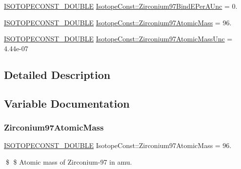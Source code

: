 \begin{DoxyCompactItemize}
\mbox{\hyperlink{group___isotope_const-_macros_ga8f45a7272ce02c0b4c65c44636ed719a}{I\+S\+O\+T\+O\+P\+E\+C\+O\+N\+S\+T\+\_\+\+D\+O\+U\+B\+LE}} \mbox{\hyperlink{group___isotope_const-_zirconium-_zr97_ga4cab043a49d376b7a4b9d2be0797d036}{Isotope\+Const\+::\+Zirconium97\+Bind\+E\+Per\+A\+Unc}} = 0.
\item 
\mbox{\hyperlink{group___isotope_const-_macros_ga8f45a7272ce02c0b4c65c44636ed719a}{I\+S\+O\+T\+O\+P\+E\+C\+O\+N\+S\+T\+\_\+\+D\+O\+U\+B\+LE}} \mbox{\hyperlink{group___isotope_const-_zirconium-_zr97_ga5b9400ceeea44bc77dfec0ffc5feb961}{Isotope\+Const\+::\+Zirconium97\+Atomic\+Mass}} = 96.
\item 
\mbox{\hyperlink{group___isotope_const-_macros_ga8f45a7272ce02c0b4c65c44636ed719a}{I\+S\+O\+T\+O\+P\+E\+C\+O\+N\+S\+T\+\_\+\+D\+O\+U\+B\+LE}} \mbox{\hyperlink{group___isotope_const-_zirconium-_zr97_ga9b56fb365d59a12850ce90800a4f4600}{Isotope\+Const\+::\+Zirconium97\+Atomic\+Mass\+Unc}} = 4.\+44e-\/07
\end{DoxyCompactItemize}


\subsection{Detailed Description}


\subsection{Variable Documentation}
\mbox{\label{group___isotope_const-_zirconium-_zr97_ga5b9400ceeea44bc77dfec0ffc5feb961}} 
\subsubsection{\texorpdfstring{Zirconium97\+Atomic\+Mass}{Zirconium97AtomicMass}}
{\footnotesize\ttfamily \mbox{\hyperlink{group___isotope_const-_macros_ga8f45a7272ce02c0b4c65c44636ed719a}{I\+S\+O\+T\+O\+P\+E\+C\+O\+N\+S\+T\+\_\+\+D\+O\+U\+B\+LE}} Isotope\+Const\+::\+Zirconium97\+Atomic\+Mass = 96.}

\$ \$ Atomic mass of Zirconium-\/97 in amu. \mbox{\label{group___isotope_const-_zirconium-_zr97_ga9b56fb365d59a12850ce90800a4f4600}} 
